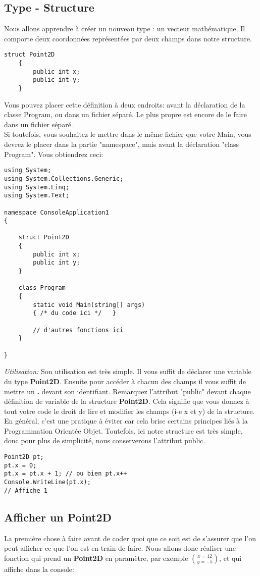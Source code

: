 \documentclass[12pt,a4paper]{report}
\begin{document}
\subsection{Type - Structure}
Nous allons apprendre à créer un nouveau type : un vecteur mathématique.
Il comporte deux coordonnées représentées par deux champs dans notre
structure.
\begin{lstlisting}
struct Point2D
    {
        public int x;
        public int y;
    }
\end{lstlisting}
Vous pouvez placer cette définition à deux endroits: avant la déclaration de la classe Program, ou
dans un fichier séparé. Le plus propre est encore de le faire dans un fichier séparé.\\
Si toutefois, vous souhaitez le mettre dans le même fichier que votre Main, vous devrez le placer dans la partie "namespace", 
mais avant la déclaration "class Program". Vous obtiendrez ceci:
\begin{lstlisting}
using System;
using System.Collections.Generic;
using System.Linq;
using System.Text;  

namespace ConsoleApplication1
{

    struct Point2D
    {
        public int x;
        public int y;
    }

    class Program
    {
        static void Main(string[] args)
        { /* du code ici */   }

        // d'autres fonctions ici 
    }

}

\end{lstlisting}
\emph{Utilisation: } Son utilisation est très simple. Il vous suffit de déclarer une
variable du type \textbf{Point2D}. Ensuite pour accéder à chacun des champs il vous
suffit de mettre un \textbf{.} devant son identifiant. Remarquez l'attribut "public" devant chaque définition de variable
de la structure \textbf{Point2D}. Cela signifie que vous donnez à tout votre code le droit de lire et modifier les champs (i-e x et y)
de la structure. En général, c'est une pratique à éviter car cela brise certains principes liés à la Programmation Orientée Objet.
Toutefois, ici notre structure est très simple, donc pour plus de simplicité, nous conserverons l'attribut public.
\begin{lstlisting}
Point2D pt;
pt.x = 0;
pt.x = pt.x + 1; // ou bien pt.x++
Console.WriteLine(pt.x);
// Affiche 1
\end{lstlisting}
\subsection{Afficher un Point2D}
La première chose à faire avant de coder quoi que ce soit est de s’assurer
que l’on peut afficher ce que l’on est en train de faire. Nous allons donc réaliser
une fonction qui prend un \textbf{Point2D} en paramètre, par exemple ${x = 12 \choose y = −5}$,
et qui affiche dans la console:\\
\end{document}

